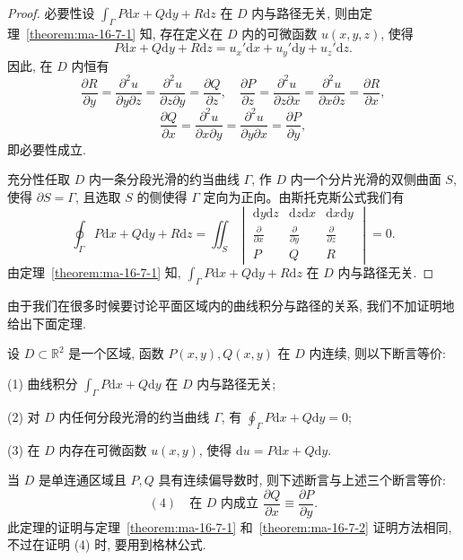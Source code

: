 \begin{proof}
必要性\quad 设 $\int_\Gamma P\mathrm dx+Q\mathrm dy+R\mathrm dz$ 在 $D$ 内与路径无关, 则由定理~\ref{theorem:ma-16-7-1} 知, 存在定义在 $D$ 内的可微函数 $u(x,y,z)$, 使得
\[
  P\mathrm dx+Q\mathrm dy+R\mathrm dz=u_x'\mathrm dx+u_y'\mathrm dy+u_z'\mathrm dz.
\]
因此, 在 $D$ 内恒有
\[
  \frac{\partial R}{\partial y}
  =\frac{\partial^2u}{\partial y\partial z}
  =\frac{\partial^2u}{\partial z\partial y}
  =\frac{\partial Q}{\partial z},
  \quad
  \frac{\partial P}{\partial z}
  =\frac{\partial^2u}{\partial z\partial x}
  =\frac{\partial^2u}{\partial x\partial z}
  =\frac{\partial R}{\partial x},
\]
\[
  \frac{\partial Q}{\partial x}
  =\frac{\partial^2u}{\partial x\partial y}
  =\frac{\partial^2u}{\partial y\partial x}
  =\frac{\partial P}{\partial y},
\]
即必要性成立.

充分性\quad 任取 $D$ 内一条分段光滑的约当曲线 $\Gamma$, 作 $D$ 内一个分片光滑的双侧曲面 $S$, 使得 $\partial S=\Gamma$, 且选取 $S$ 的侧使得 $\Gamma$ 定向为正向。由斯托克斯公式我们有
\[
  \oint_\Gamma P\mathrm dx+Q\mathrm dy+R\mathrm dz
  =
  \iint_S
  \begin{vmatrix}
    \mathrm dy\mathrm dz&\mathrm dz\mathrm dx&\mathrm dx\mathrm dy\\
    \frac{\partial}{\partial x}&\frac{\partial}{\partial y}&\frac{\partial}{\partial z}\\
    P&Q&R
  \end{vmatrix}
  =0.
\]
由定理~\ref{theorem:ma-16-7-1} 知, $\int_\Gamma P\mathrm dx+Q\mathrm dy+R\mathrm dz$ 在 $D$ 内与路径无关.
\end{proof}


由于我们在很多时候要讨论平面区域内的曲线积分与路径的关系, 我们不加证明地给出下面定理.

\begin{theorem}\label{theorem:ma-16-7-3}
设 $D\subset\mathbb R^2$ 是一个区域, 函数 $P(x,y),Q(x,y)$ 在 $D$ 内连续, 则以下断言等价:

(1) 曲线积分 $\int_\Gamma P\mathrm dx+Q\mathrm dy$ 在 $D$ 内与路径无关;

(2) 对 $D$ 内任何分段光滑的约当曲线 $\Gamma$, 有 $\oint_\Gamma P\mathrm dx+Q\mathrm dy=0$;

(3) 在 $D$ 内存在可微函数 $u(x,y)$, 使得 $\mathrm du=P\mathrm dx+Q\mathrm dy$.
\end{theorem}

当 $D$ 是单连通区域且 $P,Q$ 具有连续偏导数时, 则下述断言与上述三个断言等价:
\[
  (4)\quad \text{在 }D\text{ 内成立 }\frac{\partial Q}{\partial x}\equiv\frac{\partial P}{\partial y}.
\]
此定理的证明与定理~\ref{theorem:ma-16-7-1} 和~\ref{theorem:ma-16-7-2} 证明方法相同, 不过在证明 (4) 时, 要用到格林公式.

